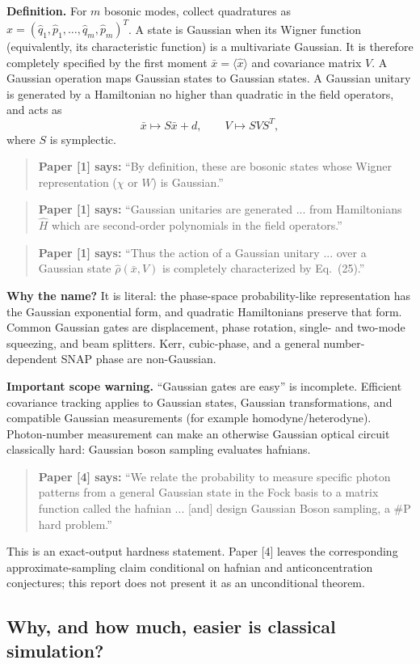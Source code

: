 \documentclass[10pt]{article}
\newcommand{\paperquote}[2]{%
  \begin{quote}\small\textbf{Paper [#1] says:} ``#2''\end{quote}}
\begin{document}
\textbf{Definition.} For $m$ bosonic modes, collect quadratures as
$\hat{x}=(\hat{q}_1,\hat{p}_1,\ldots,\hat{q}_m,\hat{p}_m)^T$.
A state is Gaussian when its Wigner function (equivalently, its characteristic function) is a
multivariate Gaussian. It is therefore completely specified by the first moment
$\bar{x}=\langle\hat{x}\rangle$ and covariance matrix $V$. A Gaussian operation maps Gaussian states
to Gaussian states. A Gaussian unitary is generated by a Hamiltonian no higher than quadratic in the
field operators, and acts as
\[
  \bar{x}\mapsto S\bar{x}+d,\qquad V\mapsto SVS^T,
\]
where $S$ is symplectic.

\paperquote{1}{By definition, these are bosonic states whose Wigner representation
(\(\chi\) or \(W\)) is Gaussian.}
\paperquote{1}{Gaussian unitaries are generated ... from Hamiltonians \(\hat H\) which are
second-order polynomials in the field operators.}
\paperquote{1}{Thus the action of a Gaussian unitary ... over a Gaussian state
\(\hat\rho(\bar{x},V)\) is completely characterized by Eq.~(25).}

\textbf{Why the name?} It is literal: the phase-space probability-like representation has the
Gaussian exponential form, and quadratic Hamiltonians preserve that form. Common Gaussian gates are
displacement, phase rotation, single- and two-mode squeezing, and beam splitters. Kerr, cubic-phase,
and a general number-dependent SNAP phase are non-Gaussian.

\textbf{Important scope warning.} ``Gaussian gates are easy'' is incomplete. Efficient covariance
tracking applies to Gaussian states, Gaussian transformations, and compatible Gaussian measurements
(for example homodyne/heterodyne). Photon-number measurement can make an otherwise Gaussian optical
circuit classically hard: Gaussian boson sampling evaluates hafnians.

\paperquote{4}{We relate the probability to measure specific photon patterns from a general Gaussian
state in the Fock basis to a matrix function called the hafnian ... [and] design Gaussian Boson
sampling, a \#P hard problem.}
This is an exact-output hardness statement. Paper [4] leaves the corresponding approximate-sampling
claim conditional on hafnian and anticoncentration conjectures; this report does not present it as
an unconditional theorem.

\subsection{Why, and how much, easier is classical simulation?}
\end{document}
